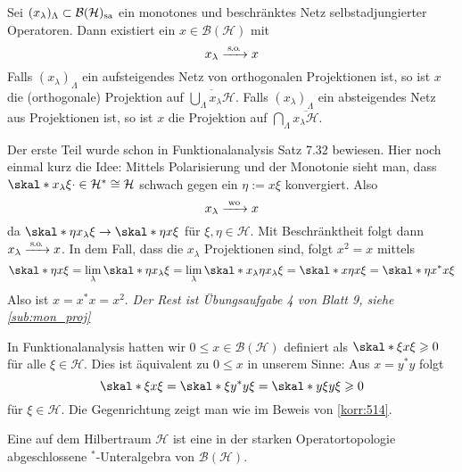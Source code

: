 \begin{satz}[label=satz:62,{name=[monotone Netze selbstadjungierter Operatoren]}]
	Sei $(x_\lambda)_\Lambda \subset \mathcal{B}(\mathcal{H})_{\mathrm{sa}}$ ein monotones und beschränktes Netz selbstadjungierter Operatoren.
	Dann existiert ein $x \in \mathcal{B}(\mathcal{H})$ mit 
	\[
		x_\lambda \grenzw{\so} x
	\]
	Falls $(x_\lambda)_\Lambda$ ein aufsteigendes Netz von orthogonalen Projektionen ist, so ist $x$ die (orthogonale) Projektion auf $\overline{\bigcup_{\Lambda} x_\lambda \mathcal{H}}$.
	Falls $(x_\lambda)_\Lambda$ ein absteigendes Netz aus Projektionen ist, so ist $x$ die Projektion auf $\bigcap_\Lambda\overline{x_\lambda \mathcal{H}}$.
\end{satz}
\begin{beweis}
	Der erste Teil wurde schon in Funktionalanalysis Satz 7.32 bewiesen. 
	Hier noch einmal kurz die Idee: 
	Mittels Polarisierung und der Monotonie sieht man, dass $\skal*{x_\lambda \xi}{\cdot} \in \mathcal{H}^*\cong \mathcal{H}$ schwach gegen ein $\eta:= x \xi$ konvergiert.
	Also
	\[
		x_\lambda \grenzw{\mathrm{wo}} x
	\]
	da $\skal*{\eta}{x_\lambda \xi} \to \skal*{\eta}{x \xi}$ für $\xi,\eta \in \mathcal{H}$. 
	Mit Beschränktheit folgt dann $x_\lambda \grenzw{\so} x$.
	In dem Fall, dass die $x_\lambda$ Projektionen sind, folgt $x^2=x$ mittels 
	\[
		\skal*{\eta}{x \xi} = \lim_\lambda \skal*{\eta}{x_\lambda \xi} = \lim_\lambda \skal*{x_\lambda \eta}{x_\lambda \xi} = \skal*{x \eta}{x \xi} = \skal*{\eta}{x^* x \xi}
	\]
	Also ist $x=x^*x=x^2$. \emph{Der Rest ist Übungsaufgabe 4 von Blatt 9, siehe \cref{sub:mon_proj}}
\end{beweis}

\begin{bemerkung}[{name=[verschiedene Definitionen von Positivität]}]
	In Funktionalanalysis hatten wir $0\le x \in \mathcal{B}(\mathcal{H})$ definiert als $\skal*{\xi}{x \xi} \ge 0$ für alle $\xi \in \mathcal{H}$.
	Dies ist äquivalent zu $0\le x$ in unserem Sinne: 
	Aus $x=y^*y$ folgt 
	\[
		\skal*{\xi}{x \xi} = \skal*{\xi}{y^*y \xi} = \skal*{y \xi}{y \xi} \ge 0
	\]
	für $\xi \in \mathcal{H}$. 
	Die Gegenrichtung zeigt man wie im Beweis von \autoref{korr:514}.
\end{bemerkung}

\begin{definition}[{name=[von-Neumann-Algebra]}]
	Eine  auf dem Hilbertraum $\mathcal{H}$ ist eine in der starken Operatortopologie abgeschlossene $^*$-Unteralgebra von $\mathcal{B}(\mathcal{H})$.
\end{definition}

